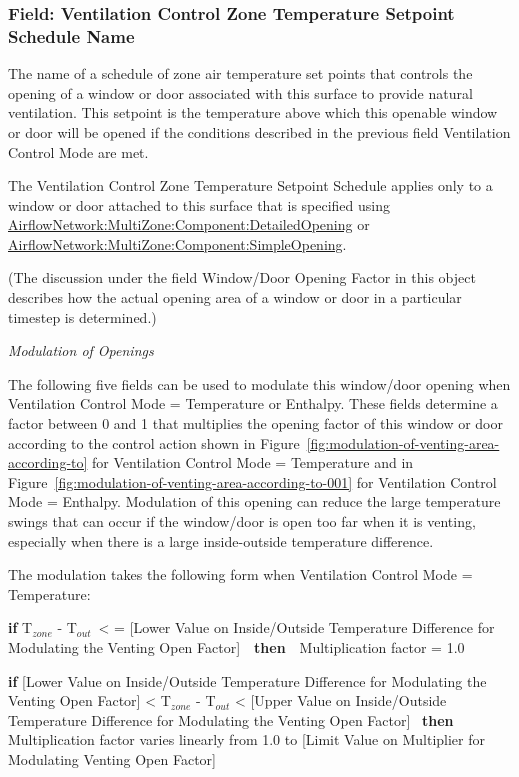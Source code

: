 \subsubsection{Field: Ventilation Control Zone Temperature Setpoint Schedule Name}\label{field-ventilation-control-zone-temperature-setpoint-schedule-name-1}

The name of a schedule of zone air temperature set points that controls the opening of a window or door associated with this surface to provide natural ventilation. This setpoint is the temperature above which this openable window or door will be opened if the conditions described in the previous field Ventilation Control Mode are met.

The Ventilation Control Zone Temperature Setpoint Schedule applies only to a window or door attached to this surface that is specified using \hyperref[airflownetworkmultizonecomponentdetailedopening]{AirflowNetwork:MultiZone:Component:DetailedOpening} or \hyperref[airflownetworkmultizonecomponentsimpleopening]{AirflowNetwork:MultiZone:Component:SimpleOpening}.

(The discussion under the field Window/Door Opening Factor in this object describes how the actual opening area of a window or door in a particular timestep is determined.)

\emph{Modulation of Openings}

The following five fields can be used to modulate this window/door opening when Ventilation Control Mode = Temperature or Enthalpy. These fields determine a factor between 0 and 1 that multiplies the opening factor of this window or door according to the control action shown in Figure~\ref{fig:modulation-of-venting-area-according-to} for Ventilation Control Mode = Temperature and in Figure~\ref{fig:modulation-of-venting-area-according-to-001} for Ventilation Control Mode = Enthalpy. Modulation of this opening can reduce the large temperature swings that can occur if the window/door is open too far when it is venting, especially when there is a large inside-outside temperature difference.

The modulation takes the following form when Ventilation Control Mode = Temperature:

\textbf{if} T\(_{zone}\) - T\(_{out}\)~\textless{} = {[}Lower Value on Inside/Outside Temperature Difference for Modulating the Venting Open Factor{]}~~\textbf{then}~~Multiplication factor = 1.0

\textbf{if} {[}Lower Value on Inside/Outside Temperature Difference for Modulating the Venting Open Factor{]} \textless{} T\(_{zone}\) - T\(_{out}\) \textless{} {[}Upper Value on Inside/Outside Temperature Difference for Modulating the Venting Open Factor{]}~ \textbf{then} Multiplication factor varies linearly from 1.0 to {[}Limit Value on Multiplier for Modulating Venting Open Factor{]}

